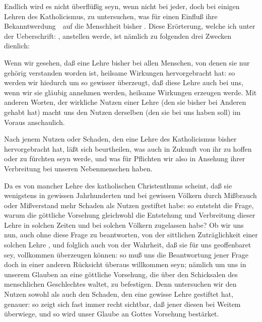 \begin{aufza}
\begin{aufzb}
\item Endlich wird es nicht überflüßig seyn, wenn nicht bei jeder, doch bei einigen Lehren des Katholicismus, zu untersuchen, was für einen Einfluß ihre Bekanntwerdung~\ auf die Menschheit bisher . Diese Erörterung, welche ich unter der Ueberschrift: , anstellen werde, ist nämlich zu folgenden drei Zwecken dienlich:
\begin{aufzc}
\item Wenn wir gesehen, daß eine Lehre bisher bei allen Menschen, von denen sie nur gehörig verstanden worden ist, heilsame Wirkungen hervorgebracht hat: so werden wir hiedurch um so gewisser überzeugt, daß diese Lehre auch bei uns, wenn wir sie gläubig annehmen werden, heilsame Wirkungen erzeugen werde. Mit anderen Worten, der wirkliche Nutzen einer Lehre (den sie bisher bei Anderen gehabt hat) macht uns den  Nutzen derselben (den sie bei uns haben soll) im Voraus anschaulich.
\item Nach jenem Nutzen oder Schaden, den eine Lehre des Katholicismus bisher hervorgebracht hat, läßt sich beurtheilen, was auch in Zukunft von ihr zu hoffen oder zu fürchten seyn werde, und was für Pflichten wir also in Ansehung ihrer Verbreitung bei unseren Nebenmenschen haben.
\item Da es von mancher Lehre des katholischen Christenthums scheint, daß sie wenigstens in gewissen Jahrhunderten und bei gewissen Völkern durch Mißbrauch oder Mißverstand mehr Schaden als Nutzen gestiftet habe: so entsteht die Frage, warum die göttliche Vorsehung gleichwohl die Entstehung und Verbreitung dieser Lehre in solchen Zeiten und bei solchen Völkern zugelassen habe?
Ob wir uns nun, auch ohne diese Frage zu beantworten, von der sittlichen Zuträglichkeit einer solchen Lehre , und folglich auch von der Wahrheit, daß sie für uns geoffenbaret sey, vollkommen überzeugen können: so muß uns die Beantwortung jener Frage doch in einer anderen Rücksicht überaus willkommen seyn; nämlich um uns in unserem Glauben an eine göttliche Vorsehung, die über den Schicksalen des menschlichen Geschlechtes waltet, zu befestigen. Denn untersuchen wir den Nutzen sowohl als auch den Schaden, den eine gewisse Lehre gestiftet hat, genauer: so zeigt sich fast immer recht sichtbar, daß jener diesen bei Weitem überwiege, und so wird unser Glaube an Gottes Vorsehung bestärket.
\end{aufzc}
\end{aufzb}

\end{aufza}
